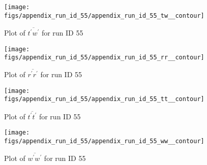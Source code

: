 \begin{figure}[H]
\centering
\texttt{[image: figs/appendix\_run\_id\_55/appendix\_run\_id\_55\_tw\_\_contour]}
\caption{Plot of $\overline{t^\prime w^\prime}$ for run ID 55}
\label{fig:appendix_run_id_55_tw__contour}
\end{figure}


\begin{figure}[H]
\centering
\texttt{[image: figs/appendix\_run\_id\_55/appendix\_run\_id\_55\_rr\_\_contour]}
\caption{Plot of $\overline{r^\prime r^\prime}$ for run ID 55}
\label{fig:appendix_run_id_55_rr__contour}
\end{figure}


\begin{figure}[H]
\centering
\texttt{[image: figs/appendix\_run\_id\_55/appendix\_run\_id\_55\_tt\_\_contour]}
\caption{Plot of $\overline{t^\prime t^\prime}$ for run ID 55}
\label{fig:appendix_run_id_55_tt__contour}
\end{figure}


\begin{figure}[H]
\centering
\texttt{[image: figs/appendix\_run\_id\_55/appendix\_run\_id\_55\_ww\_\_contour]}
\caption{Plot of $\overline{w^\prime w^\prime}$ for run ID 55}
\label{fig:appendix_run_id_55_ww__contour}
\end{figure}


